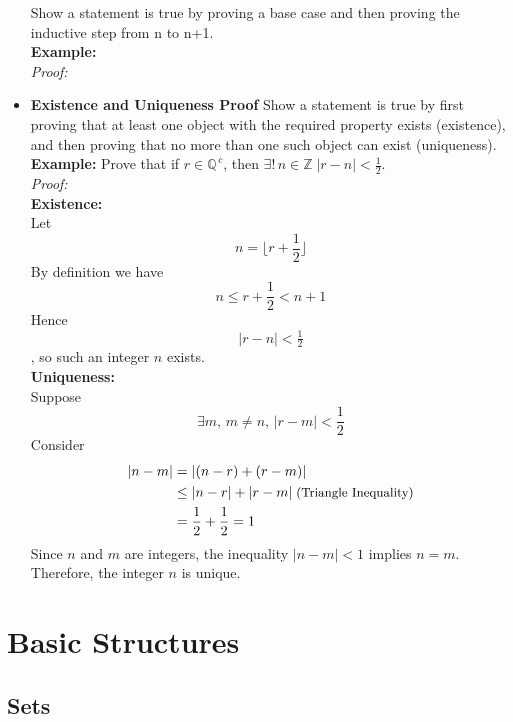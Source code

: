 \documentclass[11pt]{article}
\begin{document}
\begin{itemize}
        Show a statement is true by proving a base case and then proving the inductive step from n to n+1.\\[.5em]
        \textbf{Example:}\\
        \textit{Proof:}\\
    \item\textbf{Existence and Uniqueness Proof}
        Show a statement is true by first proving that at least one object with the required property exists (existence), and then proving that no more than one such object can exist (uniqueness).\\[.5em]
        \textbf{Example:} Prove that if $\displaystyle r \in \mathbb{Q}^{\,c}$, then $\displaystyle\exists !\, n \in \mathbb{Z} \;|r-n| < \frac{1}{2}$.\\
        \textit{Proof:}\\
        \textbf{Existence:}\\
        Let 
        \[
            n = \lfloor r + \frac{1}{2} \rfloor
        \]
        By definition we have
        \[
            n \leq r + \frac{1}{2}< n + 1
        \]
        Hence \[|r-n| < \tfrac{1}{2}\], so such an integer $n$ exists.\\
        \textbf{Uniqueness: }\\
        Suppose
        \[
            \exists m,\, m\neq n,\,|r-m|<\frac{1}{2}
        \]
        Consider
        \begin{align*} 
            |n-m| &= |(n-r)+(r-m)|\\
            &\leq|n-r| + |r-m|\;\text{\small (Triangle Inequality)}\\
            &=\frac{1}{2}+\frac{1}{2}=1
        \end{align*}
        Since $n$ and $m$ are integers, the inequality $|n-m| < 1$ implies $n = m$. Therefore, the integer $n$ is unique.
\end{itemize}
\section{Basic Structures}
\subsection{Sets}
\end{document}
